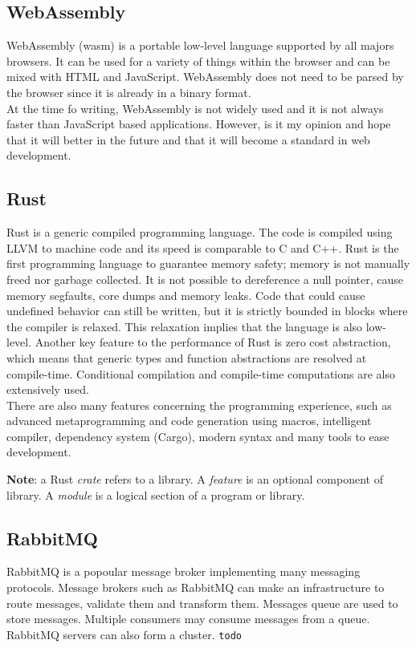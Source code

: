\documentclass[../documentation.tex]{subfiles}
\begin{document}
\subsection{WebAssembly}

WebAssembly (wasm) is a portable low-level language supported by all majors browsers.
It can be used for a variety of things within the browser and can be mixed
with HTML and JavaScript.
WebAssembly does not need to be parsed by the browser since it is already
in a binary format. \\
At the time fo writing, WebAssembly is not widely used
and it is not always faster than JavaScript based applications.
However, is it my opinion and hope that it will
better in the future and that it will become a standard in
web development.

\subsection{Rust}

Rust is a generic compiled programming language.
The code is compiled using LLVM to machine code and its speed
is comparable to C and C++.
Rust is the first programming language to guarantee memory safety;
memory is not manually freed nor garbage collected.
It is not possible to dereference a null pointer, cause memory segfaults, core dumps
and memory leaks.
Code that could cause undefined behavior can still be written,
but it is strictly bounded in blocks where the compiler is relaxed.
This relaxation implies that the language is also low-level.
Another key feature to the performance of Rust is zero cost abstraction,
which means that generic types and function abstractions are resolved at compile-time.
Conditional compilation and compile-time computations are also extensively used.
\\
There are also many features concerning the programming experience, such as
advanced metaprogramming and code generation using macros, intelligent compiler,
dependency system (Cargo), modern syntax and many tools to ease development.

\textbf{Note}: a Rust \textit{crate} refers to a library.
A \textit{feature} is an optional component of library.
A \textit{module} is a logical section of a program or library.

\subsection{RabbitMQ}

RabbitMQ is a popoular message broker implementing many messaging protocols.
Message brokers such as RabbitMQ can make an infrastructure to route messages,
validate them and transform them. Messages queue are used
to store messages. Multiple consumers may consume messages from a queue. \\
RabbitMQ servers can also form a cluster. \texttt{todo}
\end{document}
